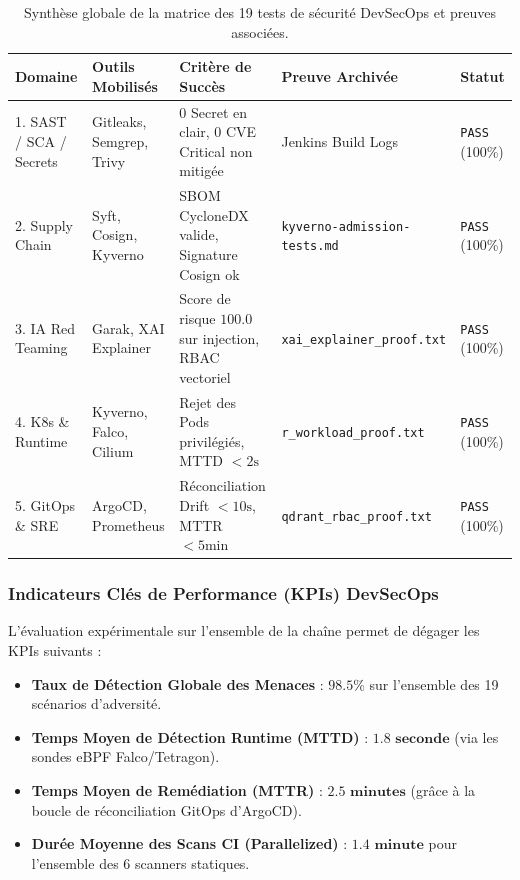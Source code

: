 \begin{table}[htbp]
\centering
\scriptsize
\begin{tabular}{@{}p{3.2cm}p{2.5cm}p{4.2cm}p{2.5cm}p{2.2cm}@{}}
\toprule
\textbf{Domaine} & \textbf{Outils Mobilisés} & \textbf{Critère de Succès} & \textbf{Preuve Archivée} & \textbf{Statut} \\
\midrule
1. SAST / SCA / Secrets & Gitleaks, Semgrep, Trivy & 0 Secret en clair, 0 CVE Critical non mitigée & Jenkins Build Logs & \texttt{PASS} (100\%) \\
2. Supply Chain & Syft, Cosign, Kyverno & SBOM CycloneDX valide, Signature Cosign ok & \texttt{kyverno-admission-tests.md} & \texttt{PASS} (100\%) \\
3. IA Red Teaming & Garak, XAI Explainer & Score de risque $100.0$ sur injection, RBAC vectoriel & \texttt{xai\_explainer\_proof.txt} & \texttt{PASS} (100\%) \\
4. K8s \& Runtime & Kyverno, Falco, Cilium & Rejet des Pods privilégiés, MTTD $< 2\text{s}$ & \texttt{r\_workload\_proof.txt} & \texttt{PASS} (100\%) \\
5. GitOps \& SRE & ArgoCD, Prometheus & Réconciliation Drift $< 10\text{s}$, MTTR $< 5\text{min}$ & \texttt{qdrant\_rbac\_proof.txt} & \texttt{PASS} (100\%) \\
\bottomrule
\end{tabular}
\caption{Synthèse globale de la matrice des 19 tests de sécurité DevSecOps et preuves associées.}
\label{tab:synthesis_19_tests}
\end{table}

\subsubsection{Indicateurs Clés de Performance (KPIs) DevSecOps}
L'évaluation expérimentale sur l'ensemble de la chaîne permet de dégager les KPIs suivants :
\begin{itemize}
    \item \textbf{Taux de Détection Globale des Menaces} : $\mathbf{98.5\%}$ sur l'ensemble des 19 scénarios d'adversité.
    \item \textbf{Temps Moyen de Détection Runtime (MTTD)} : $\mathbf{1.8\text{ seconde}}$ (via les sondes eBPF Falco/Tetragon).
    \item \textbf{Temps Moyen de Remédiation (MTTR)} : $\mathbf{2.5\text{ minutes}}$ (grâce à la boucle de réconciliation GitOps d'ArgoCD).
    \item \textbf{Durée Moyenne des Scans CI (Parallelized)} : $\mathbf{1.4\text{ minute}}$ pour l'ensemble des 6 scanners statiques.
\end{itemize}



